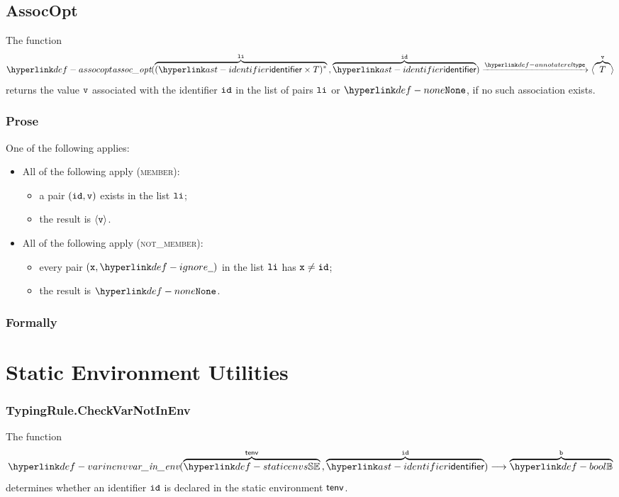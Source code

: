 \subsection{AssocOpt}
\hypertarget{def-assocopt}{}
The function
\[
  \assocopt(\overname{(\identifier\times T)^*}{\vli} \aslsep \overname{\identifier}{\id}) \typearrow \langle \overname{T}{\vv} \rangle
\]
returns the value $\texttt{v}$ associated with the identifier $\texttt{id}$ in the list of pairs $\texttt{li}$ or $\None$, if no such association exists.

\subsubsection{Prose}
One of the following applies:
\begin{itemize}
  \item All of the following apply (\textsc{member}):
  \begin{itemize}
    \item a pair $(\texttt{id},\texttt{v})$ exists in the list $\texttt{li}$;
    \item the result is $\langle\texttt{v}\rangle$.
  \end{itemize}

  \item All of the following apply (\textsc{not\_member}):
  \begin{itemize}
    \item every pair $(\vx,\Ignore)$ in the list $\texttt{li}$ has $\texttt{x}\neq\texttt{id}$;
    \item the result is $\None$.
  \end{itemize}
\end{itemize}

\subsubsection{Formally}

\section{Static Environment Utilities}

\hypertarget{def-checkvarnotinenv}{}
\hypertarget{def-varinenv}{}
\subsubsection{TypingRule.CheckVarNotInEnv}
The function
\[
  \varinenv{\overname{\staticenvs}{\tenv} \aslsep \overname{\identifier}{\id}}
  \aslto \overname{\Bool}{\vb}
\]
determines whether an identifier $\texttt{id}$ is declared in the static environment $\textsf{tenv}$.

